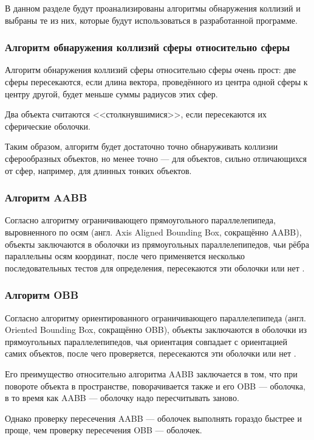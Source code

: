 В данном разделе будут проанализированы алгоритмы обнаружения коллизий и выбраны те из них, которые будут использоваться в разработанной программе.

\subsubsection{Алгоритм обнаружения коллизий сферы относительно сферы}

Алгоритм обнаружения коллизий сферы относительно сферы очень прост: две сферы пересекаются, если длина вектора, проведённого из центра одной сферы к центру другой, будет меньше суммы радиусов этих сфер. %

Два объекта считаются <<столкнувшимися>>, если пересекаются их сферические оболочки.

Таким образом, алгоритм будет достаточно точно обнаруживать коллизии сферообразных объектов, но менее точно --- для объектов, сильно отличающихся от сфер, например, для длинных тонких объектов.

\subsubsection{Алгоритм AABB}

Согласно алгоритму ограничивающего прямоугольного параллелепипеда, выровненного по осям (англ. Axis Aligned Bounding Box, сокращённо AABB), объекты заключаются в оболочки из прямоугольных параллелепипедов, чьи рёбра параллельны осям координат, после чего применяется несколько последовательных тестов для определения, пересекаются эти оболочки или нет \cite{gea}. %

\subsubsection{Алгоритм OBB}

Согласно алгоритму ориентированного ограничивающего параллелепипеда (англ. Oriented Bounding Box, сокращённо OBB), объекты заключаются в оболочки из прямоугольных параллелепипедов, чья ориентация совпадает с ориентацией самих объектов, после чего проверяется, пересекаются эти оболочки или нет \cite{gea}. %

Его преимущество относительно алгоритма AABB заключается в том, что при повороте объекта в пространстве, поворачивается также и его OBB --- оболочка, в то время как AABB --- оболочку надо пересчитывать заново.

Однако проверку пересечения AABB --- оболочек выполнять гораздо быстрее и проще, чем проверку пересечения OBB --- оболочек.

